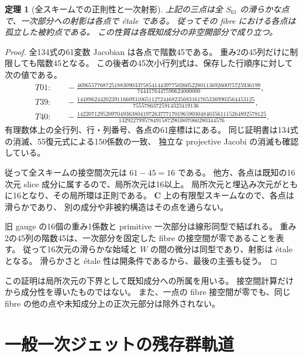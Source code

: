 \documentclass[11pt,a4paper]{ltjsarticle}
\newcommand{\CC}{\mathbf C}
\newtheorem{theorem}{定理}[section]
\theoremstyle{remark}
\begin{document}
\begin{theorem}[全スキームでの正則性と一次射影]\label{thm:etale}
上記の三点は全 $S_{61}$ の滑らかな点で、一次部分への射影は各点で \'etale である。
従ってその fibre における各点は孤立した被約点である。
この性質は各既知成分の非空開部分で成り立つ。
\end{theorem}
\begin{proof}
全134式の61変数 Jacobian は各点で階数45である。
重み2の45列だけに制限しても階数45となる。
この後者の45次小行列式は、保存した行順序に対して次の値である。
\begingroup\small
\begin{align*}
 T01:&\quad-\frac{4696557768725188309033758541443977502605228011369260075725936199}
                       {7444176447590624000000},\\
 T39:&\quad-\frac{14489624420239116609310651127244682356831617653369903564453125}
                       {75557863725914323419136},\\
 T40:&\quad-\frac{142207129520970493638041972637771701965903048403561115264892578125}
                       {1329227995784915872903807060280344576}.
\end{align*}
\endgroup
有理数体上の全行列、行・列番号、各点の61座標は\cite{known-fiber-certificate}にある。
同じ証明書は134式の消滅、55復元式による150係数の一致、
独立な projective Jacobi の消滅も確認している。

従って全スキームの接空間次元は $61-45=16$ である。
他方、各点は既知の16次元 slice 成分に属するので、局所次元は16以上。
局所次元と埋込み次元がともに16となり、その局所環は正則である。
$\CC$ 上の有限型スキームなので、各点は滑らかであり、
別の成分や非被約構造はその点を通らない。

旧 gauge の16個の重み1係数と primitive 一次部分は線形同型で結ばれる。
重み2の45列の階数45は、一次部分を固定した fibre の接空間が零であることを表す。
従って16次元の滑らかな始域と $W$ の間の微分は同型であり、射影は \'etale となる。
滑らかさと \'etale 性は開条件であるから、最後の主張も従う。
\end{proof}

この証明は局所次元の下界として既知成分への所属を用いる。
接空間計算だけから成分性を導いたものではない。
また、一点の fibre 接空間が零でも、同じ fibre の他の点や未知成分上の正次元部分は除外されない。

\section{一般一次ジェットの残存群軌道}
\end{document}
